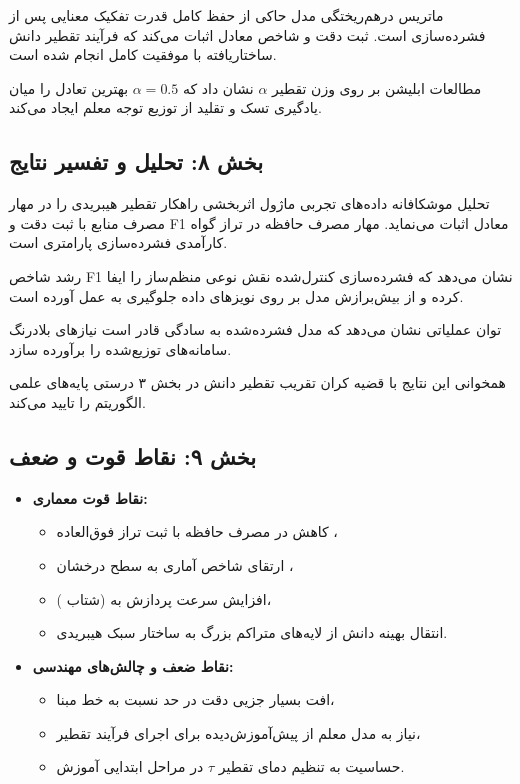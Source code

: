 ماتریس درهم‌ریختگی مدل حاکی از حفظ کامل قدرت تفکیک معنایی پس از فشرده‌سازی است. ثبت دقت  و شاخص  معادل  اثبات می‌کند که فرآیند تقطیر دانش ساختاریافته با موفقیت کامل انجام شده است.

مطالعات ابلیشن بر روی وزن تقطیر $\alpha$ نشان داد که $\alpha = 0.5$ بهترین تعادل را میان یادگیری تسک و تقلید از توزیع توجه معلم ایجاد می‌کند.

\subsection*{بخش ۸: تحلیل و تفسیر نتایج }
تحلیل موشکافانه داده‌های تجربی ماژول  اثربخشی راهکار تقطیر هیبریدی را در مهار مصرف منابع با ثبت دقت  و F1 معادل  اثبات می‌نماید. مهار مصرف حافظه در تراز  گواه کارآمدی فشرده‌سازی پارامتری است.

رشد شاخص F1 نشان می‌دهد که فشرده‌سازی کنترل‌شده نقش نوعی منظم‌ساز را ایفا کرده و از بیش‌برازش مدل بر روی نویزهای داده جلوگیری به عمل آورده است.

توان عملیاتی  نشان می‌دهد که مدل فشرده‌شده به سادگی قادر است نیازهای بلادرنگ سامانه‌های توزیع‌شده را برآورده سازد.

همخوانی این نتایج با قضیه کران تقریب تقطیر دانش در بخش ۳ درستی پایه‌های علمی الگوریتم را تایید می‌کند.

\subsection*{بخش ۹: نقاط قوت و ضعف }
\begin{itemize}
    \item \textbf{نقاط قوت معماری:}
    \begin{itemize}
        \item کاهش  در مصرف حافظه با ثبت تراز فوق‌العاده ،
        \item ارتقای شاخص آماری  به سطح درخشان ،
        \item افزایش سرعت پردازش به  (شتاب )،
        \item انتقال بهینه دانش از لایه‌های متراکم بزرگ به ساختار سبک هیبریدی.
    \end{itemize}
    \item \textbf{نقاط ضعف و چالش‌های مهندسی:}
    \begin{itemize}
        \item افت بسیار جزیی دقت در حد  نسبت به خط مبنا،
        \item نیاز به مدل معلم از پیش‌آموزش‌دیده برای اجرای فرآیند تقطیر،
        \item حساسیت به تنظیم دمای تقطیر $\tau$ در مراحل ابتدایی آموزش.
    \end{itemize}
\end{itemize}

